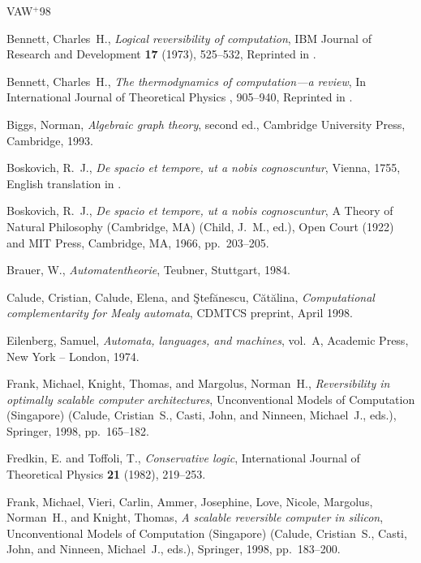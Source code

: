 \newcommand{\etalchar}[1]{$^{#1}$}
\ifx\undefined\bysame
\newcommand{\bysame}{\leavevmode\hbox to3em{\hrulefill}\,}
\fi
\begin{thebibliography}{VAW{\etalchar{+}}98}

Bennett, Charles~H., {\em Logical reversibility of computation}, IBM Journal of
  Research and Development {\bf 17} (1973), 525--532, Reprinted in \cite[pp.
  197-204]{maxwell-demon}.

Bennett, Charles~H., {\em The thermodynamics of computation---a review}, In
  International Journal of Theoretical Physics \cite{maxwell-demon}, 905--940,
  Reprinted in \cite[pp. 213-248]{maxwell-demon}.

Biggs, Norman, {\em Algebraic graph theory}, second ed., Cambridge University
  Press, Cambridge, 1993.

Boskovich, R.~J., {\em De spacio et tempore, ut a nobis cognoscuntur}, Vienna,
  1755, English translation in \cite{bos1}.

Boskovich, R.~J., {\em De spacio et tempore, ut a nobis cognoscuntur}, A Theory
  of Natural Philosophy (Cambridge, MA) (Child, J.~M., ed.), Open Court (1922)
  and MIT Press, Cambridge, MA, 1966, pp.~203--205.

Brauer, W., {\em Automatentheorie}, Teubner, Stuttgart, 1984.

Calude, Cristian, Calude, Elena, and {\c{S}}tef{\u a}nescu, C{\u a}t{\u a}lina,
  {\em Computational complementarity for {M}ealy automata}, CDMTCS preprint,
  April 1998.

Eilenberg, Samuel, {\em Automata, languages, and machines}, vol.~A, Academic
  Press, New York -- London, 1974.

Frank, Michael, Knight, Thomas, and Margolus, Norman~H., {\em Reversibility in
  optimally scalable computer architectures}, Unconventional Models of
  Computation (Singapore) (Calude, Cristian~S., Casti, John, and Ninneen,
  Michael~J., eds.), Springer, 1998, pp.~165--182.

Fredkin, E. and Toffoli, T., {\em Conservative logic}, International Journal of
  Theoretical Physics {\bf 21} (1982), 219--253.

\bibitem[FVA{\etalchar{+}}98]{fr-kn-mar2}
Frank, Michael, Vieri, Carlin, Ammer, Josephine, Love, Nicole, Margolus,
  Norman~H., and Knight, Thomas, {\em A scalable reversible computer in
  silicon}, Unconventional Models of Computation (Singapore) (Calude,
  Cristian~S., Casti, John, and Ninneen, Michael~J., eds.), Springer, 1998,
  pp.~183--200.


\end{thebibliography}
